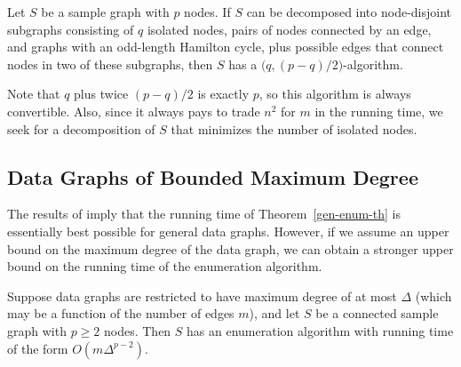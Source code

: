 \begin{theorem}\label{gen-enum-th}
Let $S$ be a sample graph with $p$ nodes. If $S$ can be decomposed into node-disjoint subgraphs consisting of $q$ isolated nodes, pairs of nodes connected by an edge, and
graphs with an odd-length Hamilton cycle, plus possible edges that connect nodes in two of these subgraphs, then $S$ has a $\bigl(q,(p-q)/2\bigr)$-algorithm.
\end{theorem}

Note that $q$ plus twice $(p-q)/2$ is exactly $p$, so this algorithm is always convertible.
Also, since it always pays to trade $n^2$ for $m$ in the running time, we seek for a decomposition of $S$ that minimizes the number of isolated nodes.

\subsection{Data Graphs of Bounded Maximum Degree}
\label{max-degree-sect}

The results of \cite{Alon81} imply that the running time of Theorem~\ref{gen-enum-th} is essentially best possible for general data graphs. However, if we assume an upper bound on the maximum degree of the data graph, we can obtain a stronger upper bound on the running time of the enumeration algorithm.

\begin{theorem}\label{bounded-degree-th}
Suppose data graphs are restricted to have maximum degree of at most $\Delta$ (which may be a function of the number of edges $m$), and let $S$ be a connected sample graph with $p \geq 2$ nodes. Then $S$ has an enumeration algorithm with running time of the form $O(m \Delta^{p-2})$.
\end{theorem}

